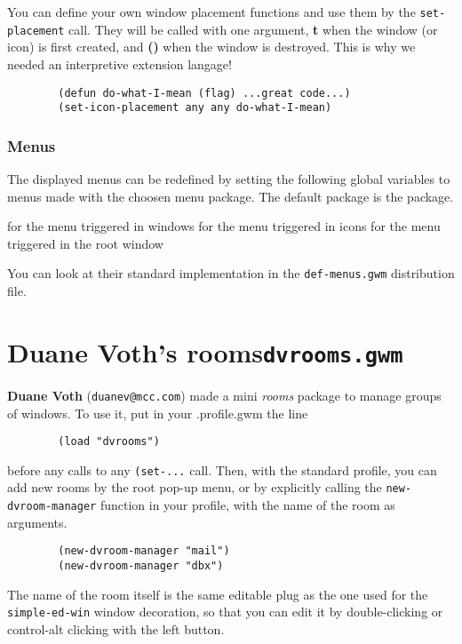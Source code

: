 You can define your own window placement functions and use them by the
\verb"set-placement" call. They will be called with one argument, {\bf t}
when the window (or icon) is first created, and {\bf ()} when the window is
destroyed. This is why we needed an interpretive extension langage!

{\exemplefont\begin{verbatim}
        (defun do-what-I-mean (flag) ...great code...)
        (set-icon-placement any any do-what-I-mean)
\end{verbatim}}

\subsubsection{Menus}

The displayed menus can be redefined by setting the following global
variables to menus made with the choosen menu package. The default package
is the  package.

\begin{description}
 for the menu triggered in windows
 for the menu triggered in icons
 for the menu triggered in the root window
\end{description}

You can look at their standard implementation in the \verb"def-menus.gwm"
distribution file.

\section{Duane Voth's rooms\hfill{\tt dvrooms.gwm}}
\label{dvroom}

{\bf Duane Voth} (\verb"duanev@mcc.com") made a mini {\em rooms} 
package to manage groups of windows. To use it, put in your .profile.gwm
the line
\begin{verbatim}
        (load "dvrooms")
\end{verbatim}
before any calls to any \verb"(set-..." call.
Then, with the standard profile, you can add new rooms by the root pop-up menu,
or by explicitly calling the \verb"new-dvroom-manager" function in your
profile, with the name of the room as arguments.
{\exemplefont\begin{verbatim}
        (new-dvroom-manager "mail")
        (new-dvroom-manager "dbx")
\end{verbatim}}
The name of the room itself is the same editable plug as the one used for
the \verb"simple-ed-win" window decoration, so that you can edit it
by double-clicking or control-alt clicking with the left button.

